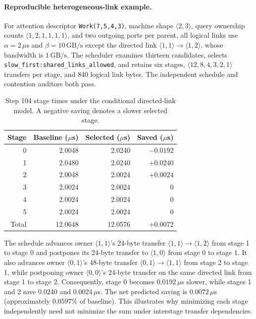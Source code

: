 \documentclass[11pt]{article}
\begin{document}
\paragraph{Reproducible heterogeneous-link example.}
For attention descriptor \texttt{Work(7,5,4,3)}, machine shape
$\langle2,3\rangle$, query ownership counts
$\langle1,2,1,1,1,1\rangle$, and two outgoing ports per parent,
all logical links use $\alpha=2\,\mu\mathrm{s}$ and
$\beta=10\,\mathrm{GB/s}$ except the directed link
$\langle1,1\rangle\rightarrow\langle1,2\rangle$, whose bandwidth is
$1\,\mathrm{GB/s}$. The scheduler examines thirteen candidates, selects
\texttt{slow\_first:shared\_links\_allowed}, and retains six stages,
$\langle12,8,4,3,2,1\rangle$ transfers per stage, and 840 logical
link bytes. The independent schedule and contention auditors both pass.

\begin{table}[htbp]\centering\small
\caption{Step 104 stage times under the conditional directed-link model.
A negative saving denotes a slower selected stage.}
\label{tab:step104-stages}
\begin{tabular}{rrrr}\toprule
Stage & Baseline ($\mu$s) & Selected ($\mu$s) & Saved ($\mu$s)\\\midrule
0 & 2.0048 & 2.0240 & $-0.0192$\\
1 & 2.0480 & 2.0240 & $+0.0240$\\
2 & 2.0048 & 2.0024 & $+0.0024$\\
3 & 2.0024 & 2.0024 & $0$\\
4 & 2.0024 & 2.0024 & $0$\\
5 & 2.0024 & 2.0024 & $0$\\\midrule
Total & 12.0648 & 12.0576 & $+0.0072$\\\bottomrule
\end{tabular}
\end{table}

The schedule advances owner $\langle1,1\rangle$'s 24-byte transfer
$\langle1,1\rangle\rightarrow\langle1,2\rangle$ from stage 1 to stage 0
and postpones its 24-byte transfer to $\langle1,0\rangle$ from stage 0
to stage 1. It also advances owner $\langle0,1\rangle$'s 48-byte transfer
$\langle0,1\rangle\rightarrow\langle1,1\rangle$ from stage 2 to stage 1,
while postponing owner $\langle0,0\rangle$'s 24-byte transfer on the same
directed link from stage 1 to stage 2. Consequently, stage 0 becomes
$0.0192\,\mu$s slower, while stages 1 and 2 save $0.0240$ and
$0.0024\,\mu$s. The net predicted saving is $0.0072\,\mu$s
(approximately $0.0597\%$ of baseline). This illustrates why minimizing
each stage independently need not minimize the sum under interstage
transfer dependencies.
\end{document}
